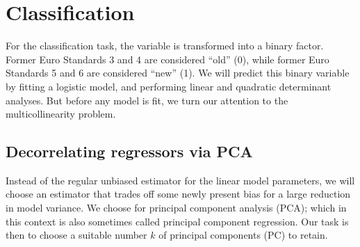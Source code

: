\documentclass[a4paper, 12pt]{article}
\newcommand{\varr}[1]{\texttt{\StrSubstitute{#1}{ }{\_\allowbreak}}}
\begin{document}
\pagebreak
\section{Classification}
\FloatBarrier

For the classification task, the variable \varr{euro standard} is transformed into a binary factor. Former Euro Standards 3 and 4 are considered ``old'' (0), while former Euro Standards 5 and 6 are considered ``new'' (1). We will predict this binary variable by fitting a logistic model, and performing linear and quadratic determinant analyses. But before any model is fit, we turn our attention to the multicollinearity problem.

\subsection*{Decorrelating regressors via PCA}

Instead of the regular unbiased estimator for the linear model parameters, we will choose an estimator that trades off some newly present bias for a large reduction in model variance. We choose for principal component analysis (PCA); which in this context is also sometimes called principal component regression. Our task is then to choose a suitable number $k$ of principal components (PC) to retain.
\end{document}

